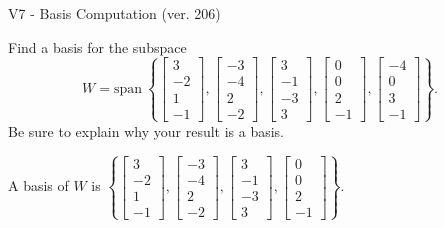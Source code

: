 \begin{exercise}
  \begin{exerciseTitle}V7 - Basis Computation (ver. 206)\end{exerciseTitle}
  \begin{exerciseStatement}
    Find a basis for the subspace 
\[W=\mathrm{span}\ \left\{\left[\begin{array}{r}
3 \\
-2 \\
1 \\
-1
\end{array}\right] , \left[\begin{array}{r}
-3 \\
-4 \\
2 \\
-2
\end{array}\right] , \left[\begin{array}{r}
3 \\
-1 \\
-3 \\
3
\end{array}\right] , \left[\begin{array}{r}
0 \\
0 \\
2 \\
-1
\end{array}\right] , \left[\begin{array}{r}
-4 \\
0 \\
3 \\
-1
\end{array}\right]\right\}.\]
 Be sure to explain why your result is a basis.


  \end{exerciseStatement}
  \begin{exerciseAnswer}
   A basis of \(W\) is  \(\left\{\left[\begin{array}{r}
3 \\
-2 \\
1 \\
-1
\end{array}\right] , \left[\begin{array}{r}
-3 \\
-4 \\
2 \\
-2
\end{array}\right] , \left[\begin{array}{r}
3 \\
-1 \\
-3 \\
3
\end{array}\right] , \left[\begin{array}{r}
0 \\
0 \\
2 \\
-1
\end{array}\right]\right\}\).
  


  \end{exerciseAnswer}
\end{exercise}